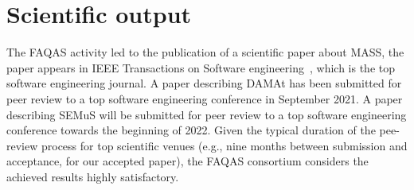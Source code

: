 
\chapter{Scientific output}

The FAQAS activity led to the publication of a scientific paper about MASS, the paper appears in IEEE Transactions on Software engineering~\cite{Oscar:MASS:TSE}, which is the top software engineering journal.
A paper describing DAMAt has been submitted for peer review to a top software engineering conference in September 2021. A paper describing SEMuS will be submitted for peer review to a top software engineering conference towards the beginning of 2022. Given the typical duration of the pee-review process for top scientific venues (e.g., nine months between submission and acceptance, for our accepted paper), the FAQAS consortium considers the achieved results highly satisfactory.

